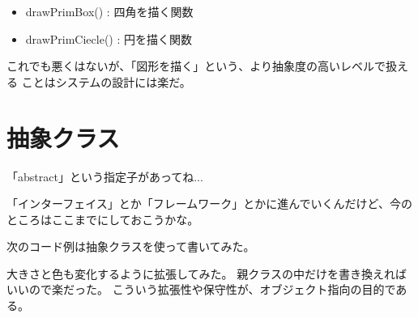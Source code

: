 \documentclass[uplatex,a4j,11pt]{jsarticle}
\begin{document}
\begin{itemize}
 \item drawPrimBox() : 四角を描く関数
 \item drawPrimCiecle() : 円を描く関数
\end{itemize}

これでも悪くはないが、「図形を描く」という、より抽象度の高いレベルで扱える
ことはシステムの設計には楽だ。

\section{抽象クラス}

「abstract」という指定子があってね...

「インターフェイス」とか「フレームワーク」とかに進んでいくんだけど、今の
ところはここまでにしておこうかな。

次のコード例は抽象クラスを使って書いてみた。

大きさと色も変化するように拡張してみた。
親クラスの中だけを書き換えればいいので楽だった。
こういう拡張性や保守性が、オブジェクト指向の目的である。
\end{document}
